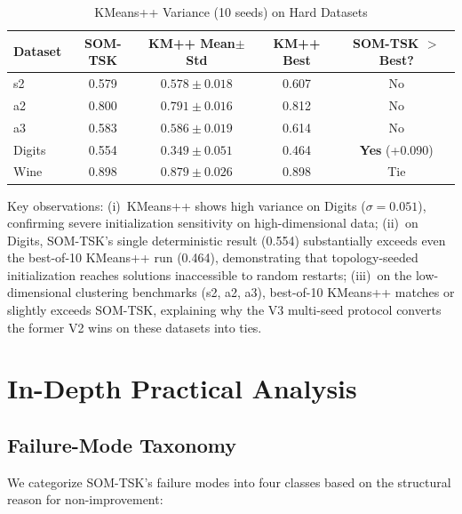 \documentclass[journal]{IEEEtran}
\begin{document}
\begin{table}[!t]
\caption{KMeans++ Variance (10 seeds) on Hard Datasets}
\label{tab:km_variance}
\centering
\renewcommand{\arraystretch}{1.1}
\small
\begin{tabular}{lcccc}
\toprule
Dataset & SOM-TSK & KM++ Mean$\pm$Std & KM++ Best & SOM-TSK $>$ Best? \\
\midrule
s2 & 0.579 & $0.578 \pm 0.018$ & 0.607 & No \\
a2 & 0.800 & $0.791 \pm 0.016$ & 0.812 & No \\
a3 & 0.583 & $0.586 \pm 0.019$ & 0.614 & No \\
Digits & 0.554 & $0.349 \pm 0.051$ & 0.464 & \textbf{Yes} (+0.090) \\
Wine & 0.898 & $0.879 \pm 0.026$ & 0.898 & Tie \\
\bottomrule
\end{tabular}
\end{table}

Key observations: (i)~KMeans++ shows high variance on Digits ($\sigma = 0.051$), confirming severe initialization sensitivity on high-dimensional data; (ii)~on Digits, SOM-TSK's single deterministic result (0.554) substantially exceeds even the best-of-10 KMeans++ run (0.464), demonstrating that topology-seeded initialization reaches solutions inaccessible to random restarts; (iii)~on the low-dimensional clustering benchmarks (s2, a2, a3), best-of-10 KMeans++ matches or slightly exceeds SOM-TSK, explaining why the V3 multi-seed protocol converts the former V2 wins on these datasets into ties.


\section{In-Depth Practical Analysis}
\label{sec:practical}

\subsection{Failure-Mode Taxonomy}
\label{sec:failure_taxonomy}

We categorize SOM-TSK's failure modes into four classes based on the structural reason for non-improvement:
\end{document}
